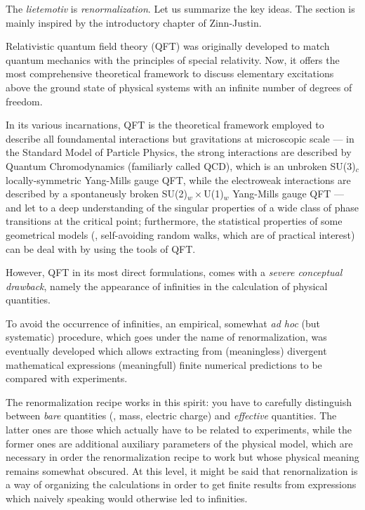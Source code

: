 




The \emph{lietemotiv} is \emph{renormalization}. Let us summarize the key
ideas. The section is mainly inspired by the introductory chapter of
Zinn-Justin.

Relativistic quantum field theory (QFT) was originally developed to match
quantum mechanics with the principles of special relativity. 
Now, it offers the most comprehensive theoretical framework to discuss
elementary excitations above the ground state of physical systems with an
infinite number of degrees of freedom.

In its various incarnations, QFT is the theoretical framework employed to
describe all foundamental interactions but
gravitations at microscopic scale --- in the Standard Model of Particle Physics,
the strong interactions  are described by  Quantum Chromodynamics (familiarly
called QCD), which is 
an unbroken SU(3)$_{c}$ locally-symmetric Yang-Mills gauge QFT, while the electroweak
interactions are described by  a spontaneusly broken SU(2)$_{w}
\times$U(1)$_{w}$ Yang-Mills gauge QFT ---  and
let to a deep understanding of the singular properties of a wide class of phase
transitions at the critical point; furthermore, the statistical properties of
some geometrical models (\eg, self-avoiding random walks, which are of
practical interest) can be deal with by using the tools of QFT.

However, QFT in its most direct formulations, comes  with a \emph{severe conceptual
   drawback}, namely the appearance of infinities in the
calculation  of physical quantities. 

To avoid the occurrence of infinities, an empirical, somewhat \emph{ad hoc} (but
systematic) procedure,
which goes under the name of renormalization, was eventually developed which allows extracting from
(meaningless) divergent mathematical expressions
(meaningfull) finite numerical predictions to be compared with experiments.

The renormalization recipe works in this spirit: you have to carefully
distinguish between \emph{bare} quantities (\eg, mass, electric charge) and
\emph{effective}
quantities. The latter ones are those which actually have to be related to
experiments, while the former ones are additional auxiliary parameters of the
physical model, which are necessary in order the renormalization recipe to work
but whose physical meaning remains somewhat obscured.
At this level, it might be said that renornalization is a way of organizing the
calculations in order to get finite results from expressions which naively
speaking would otherwise led to infinities.

